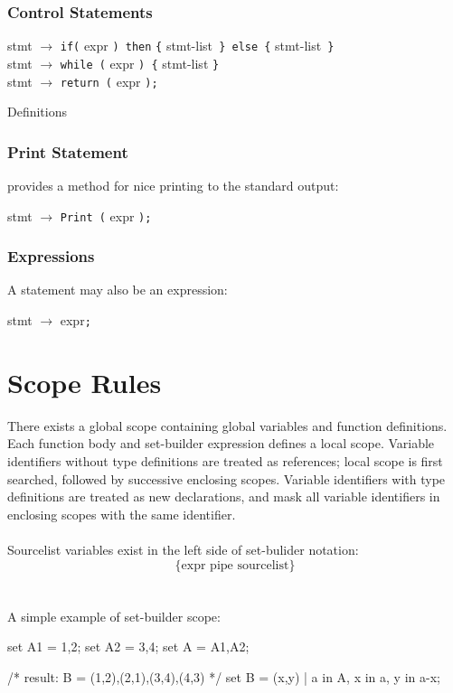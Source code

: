\subsubsection*{Control Statements}
\begin{grammar}
stmt $\to$ \verb|if(| expr \verb|) then| \verb|{| stmt-list\verb| } else {| stmt-list\verb| }|\\ 
stmt $\to$ \verb|while (| expr \verb|) {| stmt-list \verb|}|\\
stmt $\to$ \verb|return (| expr \verb|);|\\
\end{grammar}Definitions
\subsubsection*{Print Statement}
\lang provides a method for nice printing to the standard output:
\begin{grammar}
stmt $\to$ \verb|Print (| expr \verb|);| 
\end{grammar}
\subsubsection*{Expressions}
A statement may also be an expression:
\begin{grammar}
stmt $\to$ expr\verb|;|\\
\end{grammar}

\section{Scope Rules}
There exists a global scope containing global variables and function definitions.  Each function body and set-builder expression defines a local scope. Variable identifiers without type definitions are treated as references; local scope is first searched, followed by successive enclosing scopes.  Variable identifiers with type definitions are treated as new declarations, and mask all variable identifiers in enclosing scopes with the same identifier.\\\\
Sourcelist variables exist in the left side of set-bulider notation:
$$\lbrace \text{expr pipe sourcelist}\rbrace$$
\\\\
A simple example of set-builder scope:

\begin{code}
set A1 = {1,2};
set A2 = {3,4};
set A = {A1,A2};

/* result: B = {(1,2),(2,1),(3,4),(4,3)} */
set B = {(x,y) | a in A, x in a, y in a-{x}};
\end{code}

